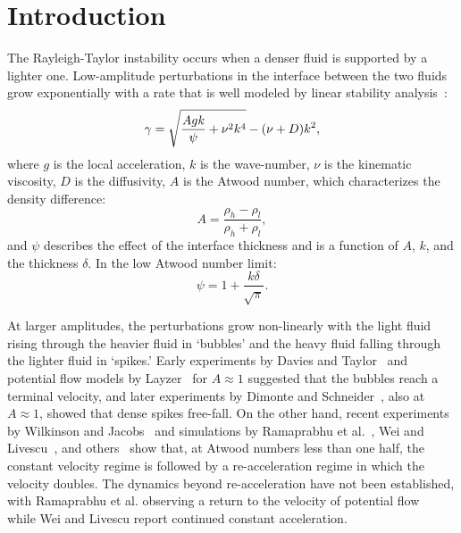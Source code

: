 \section{Introduction}

The Rayleigh-Taylor instability occurs when a denser fluid is supported by a lighter one.
Low-amplitude perturbations in the interface between the two fluids grow exponentially with a rate that is well modeled by linear stability analysis~\cite{Duff1962}:
\begin{equation} \elabel{duff}
\gamma = \sqrt{\frac{Agk}{\psi} + \nu^2 k^4} - (\nu + D) k^2,
\end{equation}
where 
$g$ is the local acceleration,
$k$ is the wave-number,
$\nu$ is the kinematic viscosity,
$D$ is the diffusivity,
$A$ is the Atwood number, which characterizes the density difference:
\begin{equation}
	A = \frac{\rho_h - \rho_l}{\rho_h + \rho_l},
\end{equation}
and $\psi$ describes the effect of the interface thickness and is a function of $A$, $k$, and the thickness $\delta$.
In the low Atwood number limit:
\begin{equation}
	\psi = 1 + \frac{k \delta}{\sqrt{\pi}} .
\end{equation}

At larger amplitudes, the perturbations grow non-linearly with the light fluid rising through the heavier fluid in `bubbles' and the heavy fluid falling through the lighter fluid in `spikes.'
Early experiments by Davies and Taylor~\cite{Davies1950a} and potential flow models by Layzer~\cite{Layzer1955} for $A \approx 1$ suggested that the bubbles reach a terminal velocity, and later experiments by Dimonte and Schneider~\cite{Dimonte1996}, also at $A \approx 1$, showed that dense spikes free-fall.
On the other hand, recent experiments by Wilkinson and Jacobs~\cite{Wilkinson2007} and simulations by Ramaprabhu et al.~\cite{Ramaprabhu2006,Ramaprabhu2012}, Wei and Livescu~\cite{Wei2012}, and others~\cite{Sohn2011} show that, at Atwood numbers less than one half, the constant velocity regime is followed by a re-acceleration regime in which the velocity doubles.
The dynamics beyond re-acceleration have not been established, with Ramaprabhu et al. observing a return to the velocity of potential flow~\cite{Goncharov2002} while Wei and Livescu report continued constant acceleration.

